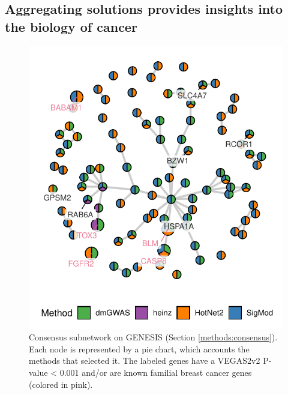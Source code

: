 \documentclass[twocolumn, 10pt]{article}
\begin{document}
\subsection{Aggregating solutions provides insights into the biology of cancer}
\label{results:consensus}
\begin{figure}[htbp]
\centering
\includegraphics[width=.9\linewidth]{./figures/figure_3.pdf}
\caption{\label{fig:consensus}
Consensus subnetwork on GENESIS (Section \ref{methods:consensus}). Each node is represented by a pie chart, which accounts the methods that selected it. The labeled genes have a VEGAS2v2 P-value < 0.001 and/or are known familial breast cancer genes (colored in pink).}
\end{figure}
\end{document}
